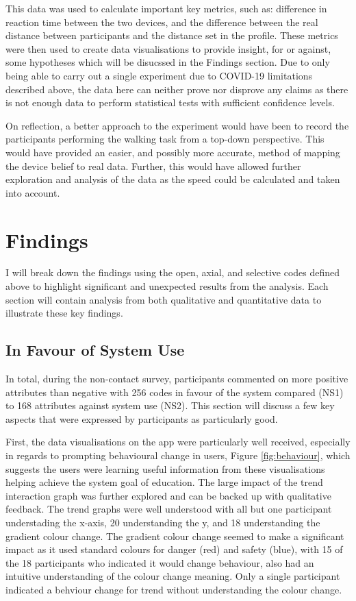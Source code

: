 \documentclass{l4proj}
\begin{document}
This data was used to calculate important key metrics, such as: difference in reaction time between the two devices, and the difference between the real distance between participants and the distance set in the profile. These metrics were then used to create data visualisations to provide insight, for or against, some hypotheses which will be disucssed in the Findings section. Due to only being able to carry out a single experiment due to COVID-19 limitations described above, the data here can neither prove nor disprove any claims as there is not enough data to perform statistical tests with sufficient confidence levels.

On reflection, a better approach to the experiment would have been to record the participants performing the walking task from a top-down perspective. This would have provided an easier, and possibly more accurate, method of mapping the device belief to real data. Further, this would have allowed further exploration and analysis of the data as the speed could be calculated and taken into account.

\section{Findings}

I will break down the findings using the open, axial, and selective codes defined above to highlight significant and unexpected results from the analysis. Each section will contain analysis from both qualitative and quantitative data to illustrate these key findings.

\subsection{In Favour of System Use}

In total, during the non-contact survey, participants commented on more positive attributes than negative with 256 codes in favour of the system compared (NS1) to 168 attributes against system use (NS2). This section will discuss a few key aspects that were expressed by participants as particularly good.

First, the data visualisations on the app were particularly well received, especially in regards to prompting behavioural change in users, Figure \ref{fig:behaviour}, which suggests the users were learning useful information from these visualisations helping achieve the system goal of education. The large impact of the trend interaction graph was further explored and can be backed up with qualitative feedback. The trend graphs were well understood with all but one participant understading the x-axis, 20 understanding the y, and 18 understanding the gradient colour change. The gradient colour change seemed to make a significant impact as it used standard colours for danger (red) and safety (blue), with 15 of the 18 participants who indicated it would change behaviour, also had an intuitive understanding of the colour change meaning. Only a single participant indicated a behviour change for trend without understanding the colour change.
\end{document}
